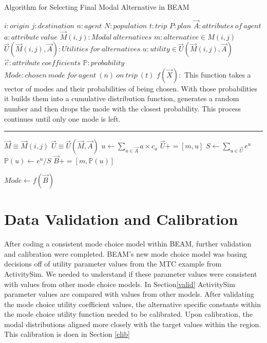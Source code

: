 \documentclass[12pt, oneside, openright]{byuthesis}
\begin{document}
\begin{algorithm}
\caption{Algorithm for Selecting Final Modal Alternative in BEAM}
\begin{algorithmic}[1]
\Require
\State $i : origin$
\State $j : destination$
\State $n: agent$
\State $N: population$
\State $t : trip $
\State $P : plan$
\State $\vec{A}: attributes\:of\:agent$
\State $a: attribute\:value$
\State $\vec{M}(i,j) : Modal\:alternatives$
\State $m : alternative \in M(i,j)$
\State $\vec{U}(\vec{M}(i,j),\vec{A}):Utilities\:for\:alternatives$
\State $u: utility \in \vec{U}(\vec{M}(i,j),\vec{A})$
\State $\vec{c}: attribute\:coefficients$
\State $\mathds{P}: probability$
\State $Mode: chosen\:mode\:for\:agent\:(n)\:on\:trip\:(t)$
\State $f(\vec{X}):$
This function takes a vector of modes and  their probabilities of being chosen. With those probabilities it builds them into a cumulative distribution function, generates a random number and then drops the mode with the closest probability. This process continues until only one mode is left.
\vspace{4pt}\hrule\vspace{5pt}

\State $\vec{M} \equiv \vec{M}(i,j)$
\State $\vec{U} \equiv \vec{U}(\vec{M},\vec{A})$
  \State $u \gets \sum_{a\in \vec{A}} a \times c_a$
  \State $\vec{U} += [m,u]$
\EndFor
\State $S \gets \sum_{u\in \vec{U}}e^u$
    \State $\mathds{P}(u)\gets e^u / S$
    \State $\vec{B} +=[m, \mathds{P}(u)]$
\EndFor 

\State $Mode \gets f(\vec{B})$

\EndProcedure

\EndFor
\EndFor
\Statex
\end{algorithmic}
\end{algorithm}

\hypertarget{mcalib}{%
\section{Data Validation and Calibration}\label{mcalib}}

After coding a consistent mode choice model within BEAM, further validation and calibration were completed. BEAM's new mode choice model was basing decisions off of utility parameter values from the MTC example from ActivitySim. We needed to understand if these parameter values were consistent with values from other mode choice models. In Section\ref{valid} ActivitySim parameter values are compared with values from other models. After validating the mode choice utility coefficient values, the alternative specific constants within the mode choice utility function needed to be calibrated. Upon calibration, the modal distributions aligned more closely with the target values within the region. This calibration is doen in Section \ref{clib}
\end{document}
